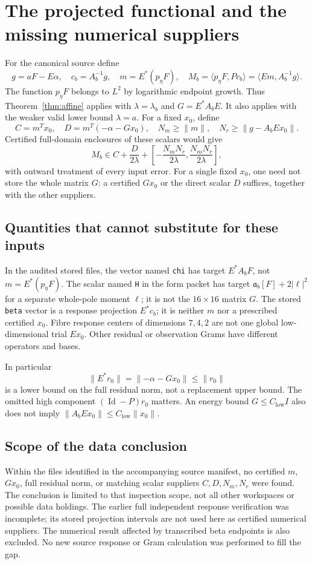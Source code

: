 \documentclass[11pt,a4paper]{article}
\newcommand{\Id}{\operatorname{Id}}
\newcommand{\ip}[2]{\langle #1,#2\rangle}
\newcommand{\norm}[1]{\lVert #1\rVert}
\newcommand{\peta}{p_{\eta}}
\theoremstyle{remark}
\numberwithin{equation}{section}
\begin{document}
\section{The projected functional and the missing numerical suppliers}\label{sec:application}
For the canonical source define
\begin{equation}\label{eq:source-M}
 g=aF-E\alpha,\quad c_b=A_b^{-1}g,\quad
 m=E^*(\peta F),\quad
 M_b=\ip{\peta F}{Pc_b}=\ip{Em}{A_b^{-1}g}.
\end{equation}
The function $\peta F$ belongs to $L^2$ by logarithmic endpoint growth.
Thus Theorem~\ref{thm:affine} applies with $\lambda=\lambda_b$ and
$G=E^*A_bE$. It also applies with the weaker valid lower bound $\lambda=a$.
For a fixed $x_0$, define
\[
 C=m^Tx_0,\quad D=m^T(-\alpha-Gx_0),\quad
 N_m\ge\norm{m},\quad N_r\ge\norm{g-A_bEx_0}.
\]
Certified full-domain enclosures of these scalars would give
\begin{equation}\label{eq:scalar-certificate}
 M_b\in C+\frac{D}{2\lambda}
              +\left[-\frac{N_mN_r}{2\lambda},\frac{N_mN_r}{2\lambda}\right],
\end{equation}
with outward treatment of every input error. For a single fixed $x_0$,
one need not store the whole matrix $G$: a certified $Gx_0$ or the direct
scalar $D$ suffices, together with the other suppliers.

\subsection{Quantities that cannot substitute for these inputs}
In the audited stored files, the vector named \texttt{chi} has target
$E^*A_bF$, not $m=E^*(\peta F)$. The scalar named \texttt{H} in the form
packet has target $\mathfrak a_b[F]+2|\ell|^2$ for a separate whole-pole
moment $\ell$; it is not the $16\times16$ matrix $G$.
The stored \texttt{beta} vector is a response projection $E^*c_b$; it is
neither $m$ nor a prescribed certified $x_0$. Fibre response centers of
dimensions $7,4,2$ are not one global low-dimensional trial $Ex_0$.
Other residual or observation Grams have different operators and bases.

In particular
\[
 \norm{E^*r_0}=\norm{-\alpha-Gx_0}\le\norm{r_0}
\]
is a lower bound on the full residual norm, not a replacement upper bound.
The omitted high component $(\Id-P)r_0$ matters. An energy bound
$G\le C_{\mathrm{low}}I$ also does not imply
$\norm{A_bEx_0}\le C_{\mathrm{low}}\norm{x_0}$.

\subsection{Scope of the data conclusion}
Within the files identified in the accompanying source manifest, no
certified $m$, $Gx_0$, full residual norm, or matching scalar suppliers
$C,D,N_m,N_r$ were found. The conclusion is limited to that inspection
scope, not all other workspaces or possible data holdings. The earlier
full independent response verification was incomplete; its stored
projection intervals are not used here as certified numerical suppliers.
The numerical result affected by transcribed beta endpoints is also
excluded. No new source response or Gram calculation was performed to
fill the gap.
\end{document}
